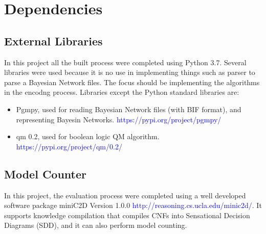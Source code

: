 \newpage
\section{Dependencies}
\subsection{External Libraries}
In this project all the built process were completed using Python 3.7. Several libraries were used because it is no use in implementing things such as parser to parse a Bayesian Network files. The focus should be implementing the algorithms in the encodng process. Libraries except the Python standard libraries are:
\begin{itemize}
      \item Pgmpy, used for reading Bayesian Network files (with BIF format), and representing Bayesin Networks. \textcolor{blue}{https://pypi.org/project/pgmpy/}
     \item qm 0.2, used for boolean logic QM algorithm.
    \textcolor{blue}{https://pypi.org/project/qm/0.2/}
\end{itemize}
    


\subsection{Model Counter}
In this project, the evaluation process were completed using a well developed software package miniC2D Version 1.0.0 \textcolor{blue}{http://reasoning.cs.ucla.edu/minic2d/}. It supports knowledge compilation that compiles CNFs into Sensational Decision Diagrams (SDD), and it can also perform model counting. 